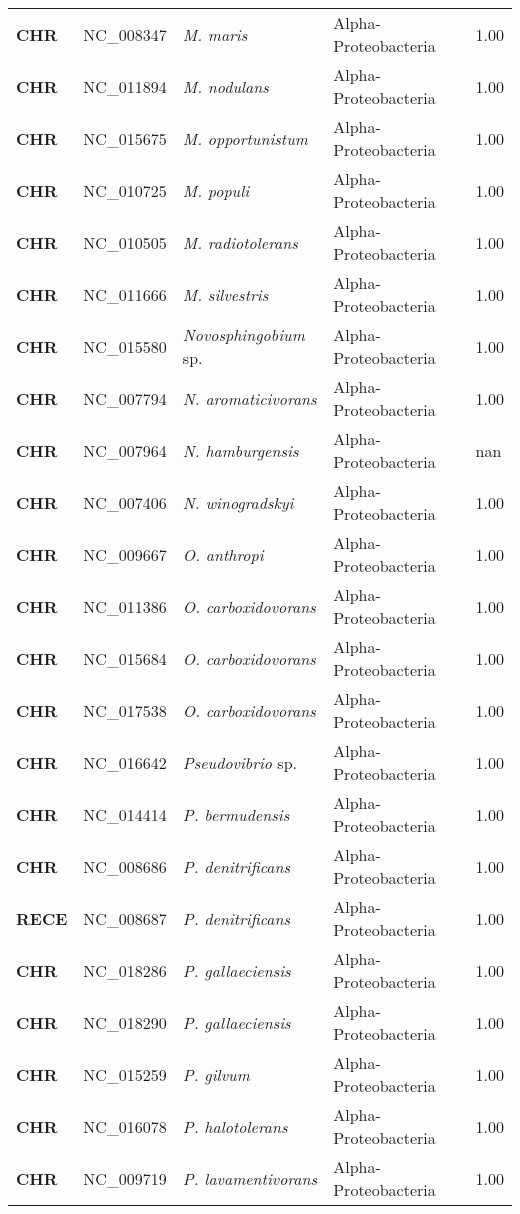 \begin{adjustwidth}{-3cm}{2cm}
{\begin{supertabular}{>{\bfseries}l|p{0.1\textwidth}p{0.14\textwidth}l|l}
CHR & NC\_008347 & \textit{M. maris} & Alpha-Proteobacteria & 1.00\\
CHR & NC\_011894 & \textit{M. nodulans} & Alpha-Proteobacteria & 1.00\\
CHR & NC\_015675 & \textit{M. opportunistum} & Alpha-Proteobacteria & 1.00\\
CHR & NC\_010725 & \textit{M. populi} & Alpha-Proteobacteria & 1.00\\
CHR & NC\_010505 & \textit{M. radiotolerans} & Alpha-Proteobacteria & 1.00\\
CHR & NC\_011666 & \textit{M. silvestris} & Alpha-Proteobacteria & 1.00\\
CHR & NC\_015580 & \textit{Novosphingobium} sp. & Alpha-Proteobacteria & 1.00\\
CHR & NC\_007794 & \textit{N. aromaticivorans} & Alpha-Proteobacteria & 1.00\\
CHR & NC\_007964 & \textit{N. hamburgensis} & Alpha-Proteobacteria & nan\\
CHR & NC\_007406 & \textit{N. winogradskyi} & Alpha-Proteobacteria & 1.00\\
CHR & NC\_009667 & \textit{O. anthropi} & Alpha-Proteobacteria & 1.00\\
CHR & NC\_011386 & \textit{O. carboxidovorans} & Alpha-Proteobacteria & 1.00\\
CHR & NC\_015684 & \textit{O. carboxidovorans} & Alpha-Proteobacteria & 1.00\\
CHR & NC\_017538 & \textit{O. carboxidovorans} & Alpha-Proteobacteria & 1.00\\
CHR & NC\_016642 & \textit{Pseudovibrio} sp. & Alpha-Proteobacteria & 1.00\\
CHR & NC\_014414 & \textit{P. bermudensis} & Alpha-Proteobacteria & 1.00\\
CHR & NC\_008686 & \textit{P. denitrificans} & Alpha-Proteobacteria & 1.00\\
RECE & NC\_008687 & \textit{P. denitrificans} & Alpha-Proteobacteria & 1.00\\
CHR & NC\_018286 & \textit{P. gallaeciensis} & Alpha-Proteobacteria & 1.00\\
CHR & NC\_018290 & \textit{P. gallaeciensis} & Alpha-Proteobacteria & 1.00\\
CHR & NC\_015259 & \textit{P. gilvum} & Alpha-Proteobacteria & 1.00\\
CHR & NC\_016078 & \textit{P. halotolerans} & Alpha-Proteobacteria & 1.00\\
CHR & NC\_009719 & \textit{P. lavamentivorans} & Alpha-Proteobacteria & 1.00\\

\end{supertabular}}
\end{adjustwidth}
